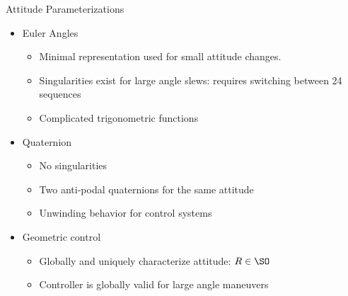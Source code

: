 \documentclass[11pt,professionalfonts]{beamer}
\begin{document}
\begin{frame}{Attitude Parameterizations}
	\begin{itemize}
		\item Euler Angles
		\begin{itemize}
			\item Minimal representation used for small attitude changes.
			\item Singularities exist for large angle slews: requires switching between 24 sequences
			\item Complicated trigonometric functions
		\end{itemize}
		\pause
		\item Quaternion 
		\begin{itemize}
			\item No singularities
			\item Two anti-podal quaternions for the same attitude
			\item Unwinding behavior for control systems
		\end{itemize}
		\pause
		\item Geometric control
		\begin{itemize}
			\item Globally and uniquely characterize attitude: \( R \in \SO \)
			\item Controller is globally valid for large angle maneuvers
		\end{itemize}
	\end{itemize}
	
    \end{frame}
\end{document}
